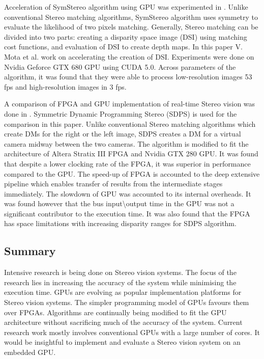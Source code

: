 Acceleration of SymStereo algorithm using GPU was experimented in \cite{Mota2014}. Unlike conventional Stereo matching algorithms, SymStereo algorithm uses symmetry to evaluate the likelihood of two pixels matching. Generally, Stereo matching can be divided into two parts: creating a disparity space image (DSI) using matching cost functions, and evaluation of DSI to create depth maps. In this paper V. Mota et al. work on accelerating the creation of DSI. Experiments were done on Nvidia Geforce GTX 680 GPU using CUDA 5.0. Across parameters of the algorithm, it was found that they were able to process low-resolution images 53 fps and high-resolution images in 3 fps.

A comparison of FPGA and GPU implementation of real-time Stereo vision was done in \cite{Kalarot2010}. Symmetric Dynamic Programming Stereo (SDPS) is used for the comparison in this paper. Unlike conventional Stereo matching algorithms which create DMs for the right or the left image, SDPS creates a DM for a virtual camera midway between the two cameras. The algorithm is modified to fit the architecture of Altera Stratix III FPGA and Nvidia GTX 280 GPU. It was found that despite a lower clocking rate of the FPGA, it was superior in performance compared to the GPU. The speed-up of FPGA is accounted to the deep extensive pipeline which enables transfer of results from the intermediate stages immediately. The slowdown of GPU was accounted to its internal overheads. It was found however that the bus input\textbackslash output time in the GPU was not a significant contributor to the execution time. It was also found that the FPGA has space limitations with increasing disparity ranges for SDPS algorithm.

\subsection{Summary}
\label{s:rwork:summary}
Intensive research is being done on Stereo vision systems. The focus of the research lies in increasing the accuracy of the system while minimising the execution time. GPUs are evolving as popular implementation platforms for Stereo vision systems. The simpler programming model of GPUs favours them over FPGAs. Algorithms are continually being modified to fit the GPU architecture without sacrificing much of the accuracy of the system. Current research work mostly involves conventional GPUs with a large number of cores. It would be insightful to implement and evaluate a Stereo vision system on an embedded GPU.